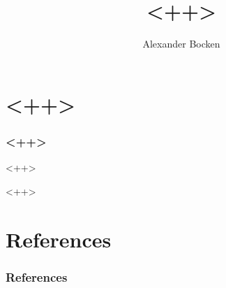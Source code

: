 \documentclass{beamer}
\title{<++>}
\author{Alexander Bocken}
\institute{ETH Zürich}
\begin{document}
\begin{frame}

\maketitle

\end{frame}

\section{<++>}

\begin{frame}
\frametitle{<++>}

<++>


\end{frame}

<++>

\section{References}

\begin{frame}
\frametitle{References}
\printbibliography
\end{frame}
\end{document}
